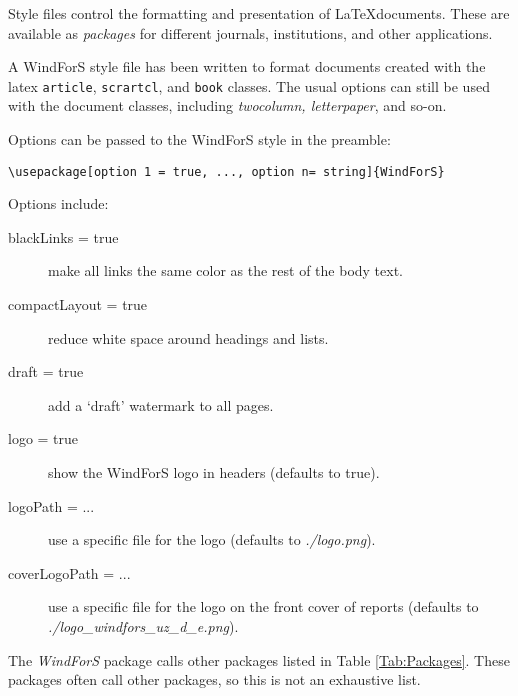 Style files control the formatting and presentation of \LaTeX documents. These are available as \emph{packages} for different journals, institutions, and other applications. 

A WindForS style file has been written to format documents created with the latex \texttt{article}, \texttt{scrartcl}, and \texttt{book} classes. The usual options can still be used with the document classes, including \emph{twocolumn, letterpaper}, and so-on.

Options can be passed to the WindForS style in the preamble:

\begin{lstlisting}
\usepackage[option 1 = true, ..., option n= string]{WindForS}
\end{lstlisting}

Options include:
\begin{description}
\item[blackLinks = true]{make all links the same color as the rest of the body text.}
\item[compactLayout = true]{reduce white space around headings and lists.}
\item[draft = true]{add a `draft' watermark to all pages.}
\item[logo = true]{show the WindForS logo in headers (defaults to true).}
\item[logoPath = ...]{use a specific file for the logo (defaults to \emph{./logo.png}).}
\item[coverLogoPath = ...]{use a specific file for the logo on the front cover of reports (defaults to \emph{./logo\_windfors\_uz\_d\_e.png}).}
\end{description}

The \emph{WindForS} package calls other packages listed in Table \ref{Tab:Packages}. These packages often call other packages, so this is not an exhaustive list.

